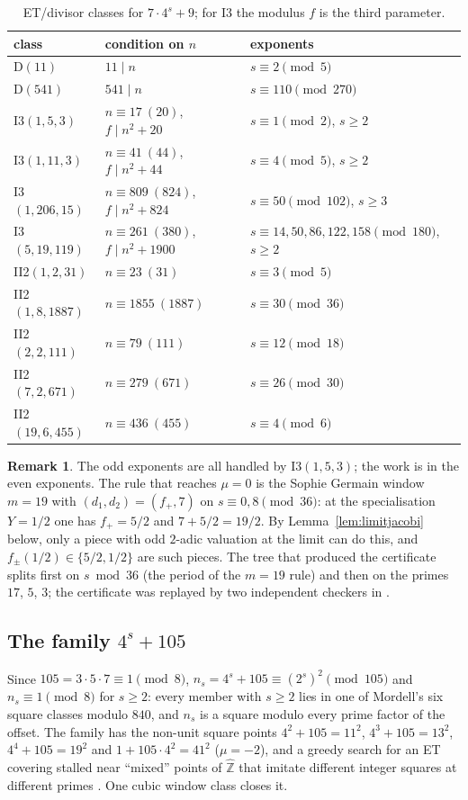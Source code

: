 \documentclass[11pt,reqno]{amsart}
\theoremstyle{definition}
\newtheorem{remark}[theorem]{Remark}
\newcommand{\Z}{\mathbb Z}
\newcommand{\Zh}{\widehat{\Z}}
\begin{document}
\begin{table}[ht]
\centering\small
\begin{tabular}{lll}
\toprule
class & condition on $n$ & exponents\\
\midrule
D$(11)$ & $11\mid n$ & $s\equiv 2\pmod{5}$ \\
D$(541)$ & $541\mid n$ & $s\equiv 110\pmod{270}$ \\
I3$(1,5,3)$ & $n\equiv17\ (20)$, $f\mid n^2+20$ & $s\equiv 1\pmod{2}$, $s\ge2$ \\
I3$(1,11,3)$ & $n\equiv41\ (44)$, $f\mid n^2+44$ & $s\equiv 4\pmod{5}$, $s\ge2$ \\
I3$(1,206,15)$ & $n\equiv809\ (824)$, $f\mid n^2+824$ & $s\equiv 50\pmod{102}$, $s\ge3$ \\
I3$(5,19,119)$ & $n\equiv261\ (380)$, $f\mid n^2+1900$ & $s\equiv 14,50,86,122,158\pmod{180}$, $s\ge2$ \\
II2$(1,2,31)$ & $n\equiv23\ (31)$ & $s\equiv 3\pmod{5}$ \\
II2$(1,8,1887)$ & $n\equiv1855\ (1887)$ & $s\equiv 30\pmod{36}$ \\
II2$(2,2,111)$ & $n\equiv79\ (111)$ & $s\equiv 12\pmod{18}$ \\
II2$(7,2,671)$ & $n\equiv279\ (671)$ & $s\equiv 26\pmod{30}$ \\
II2$(19,6,455)$ & $n\equiv436\ (455)$ & $s\equiv 4\pmod{6}$ \\
\bottomrule
\end{tabular}
\caption{ET/divisor classes for $7\cdot4^s+9$; for I3 the modulus $f$ is the
third parameter.}\label{tab:c7et}
\end{table}

\begin{remark}\label{rem:c7}
The odd exponents are all handled by I3$(1,5,3)$; the work is in the even
exponents.  The rule that reaches $\mu=0$ is the Sophie Germain window
$m=19$ with $(d_1,d_2)=(f_+,7)$ on $s\equiv0,8\pmod{36}$: at the
specialisation $Y=1/2$ one has $f_+=5/2$ and $7+5/2=19/2$.  By
Lemma~\ref{lem:limitjacobi} below, only a piece with odd $2$-adic valuation
at the limit can do this, and $f_\pm(1/2)\in\{5/2,1/2\}$ are such pieces.
The tree that produced the certificate splits first on $s\bmod 36$ (the
period of the $m=19$ rule) and then on the primes $17$, $5$, $3$; the
certificate was replayed by two independent checkers in \cite{Exp105}.
\end{remark}

\subsection{The family $4^s+105$}
Since $105=3\cdot5\cdot7\equiv1\pmod 8$, $n_s=4^s+105\equiv(2^s)^2\pmod{105}$ and
$n_s\equiv1\pmod8$ for $s\ge2$: every member with $s\ge2$ lies in one of
Mordell's six square classes modulo $840$, and $n_s$ is a square modulo every
prime factor of the offset.  The family has the non-unit square points
$4^2+105=11^2$, $4^3+105=13^2$, $4^4+105=19^2$ and $1+105\cdot4^2=41^2$
($\mu=-2$), and a greedy search for an ET covering stalled near ``mixed''
points of $\Zh$ that imitate different integer squares at different
primes \cite[\S1.4]{SignFields}.  One cubic window class closes it.
\end{document}
